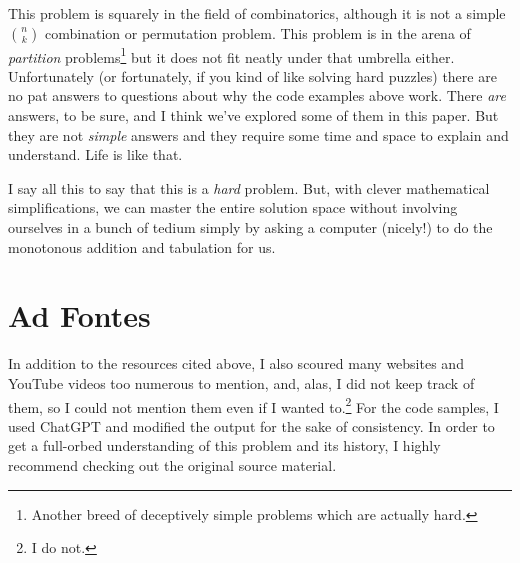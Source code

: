 This problem is squarely in the field of combinatorics, although it is not a simple $\binom{n}{k}$ combination or permutation problem.  This problem is in the arena of \textit{partition} problems\footnote{Another breed of deceptively simple problems which are actually hard.} but it does not fit neatly under that umbrella either.  Unfortunately (or fortunately, if you kind of like solving hard puzzles) there are no pat answers to questions about why the code examples above work.  There \textit{are} answers, to be sure, and I think we've explored some of them in this paper.  But they are not \textit{simple} answers and they require some time and space to explain and understand.  Life is like that.

I say all this to say that this is a \textit{hard} problem.  But, with clever mathematical simplifications, we can master the entire solution space without involving ourselves in a bunch of tedium simply by asking a computer (nicely!) to do the monotonous addition and tabulation for us.  

\section{Ad Fontes}
In addition to the resources cited above, I also scoured many websites and YouTube videos too numerous to mention, and, alas, I did not keep track of them, so I could not mention them even if I wanted to.\footnote{I do not.} For the code samples, I used ChatGPT and modified the output for the sake of consistency.  In order to get a full-orbed understanding of this problem and its history, I highly recommend checking out the original source material.


